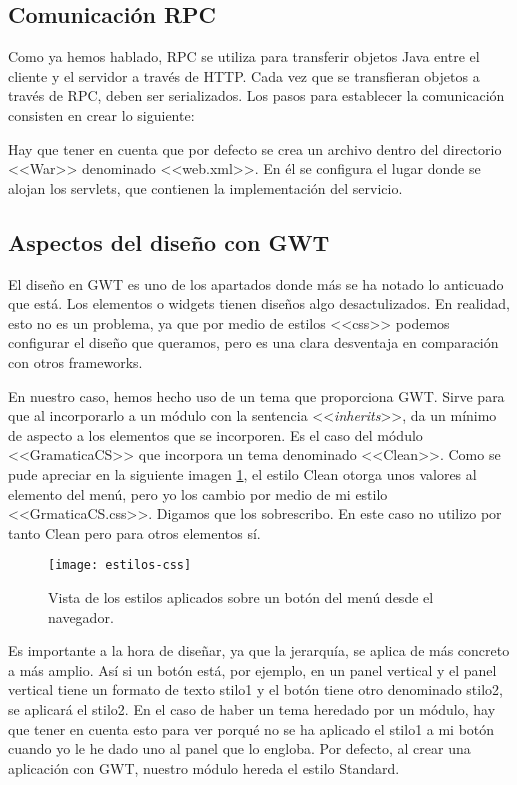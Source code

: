 \subsection{Comunicación RPC}

Como ya hemos hablado, RPC se utiliza para transferir objetos Java entre el cliente y el servidor a través de HTTP. Cada vez que se transfieran objetos a través de RPC, deben ser serializados. Los pasos para establecer la comunicación consisten en crear lo siguiente:


Hay que tener en cuenta que por defecto se crea un archivo dentro del directorio <<War>> denominado <<web.xml>>. En él se configura el lugar donde se alojan los servlets, que contienen la implementación del servicio.


\subsection{Aspectos del diseño con GWT}

El diseño en GWT es uno de los apartados donde más se ha notado lo anticuado que está. Los elementos o widgets tienen diseños algo desactulizados. En realidad, esto no es un problema, ya que por medio de estilos <<css>> podemos configurar el diseño que queramos, pero es una clara desventaja en comparación con otros frameworks.

En nuestro caso, hemos hecho uso de un tema que proporciona GWT. Sirve para que al incorporarlo a un módulo con la sentencia <<\textit{inherits}>>, da un mínimo de aspecto a los elementos que se incorporen. Es el caso del módulo <<GramaticaCS>> que incorpora un tema denominado <<Clean>>. Como se pude apreciar en la siguiente imagen \ref{fig:5.1}, el estilo Clean otorga unos valores al elemento del menú, pero yo los cambio por medio de mi estilo <<GrmaticaCS.css>>. Digamos que los sobrescribo. En este caso no utilizo por tanto Clean pero para otros elementos sí.

\begin{figure}[h]
\centering
\texttt{[image: estilos-css]}
\caption{Vista de los estilos aplicados sobre un botón del menú desde el navegador.}
\label{fig:5.1}
\end{figure}

Es importante a la hora de diseñar, ya que la jerarquía, se aplica de más concreto a más amplio. Así si un botón está, por ejemplo, en un panel vertical y el panel vertical tiene un formato de texto stilo1 y el botón tiene otro denominado stilo2, se aplicará el stilo2. En el caso de haber un tema heredado por un módulo, hay que tener en cuenta esto para ver porqué no se ha aplicado el stilo1 a mi botón cuando yo le he dado uno al panel que lo engloba. Por defecto, al crear una aplicación con GWT, nuestro módulo hereda el estilo Standard. 

